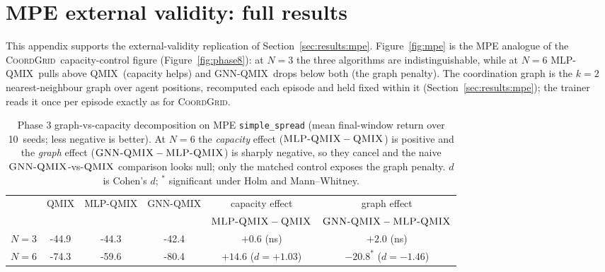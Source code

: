 \documentclass[manuscript, screen, review]{jair}
\newcommand{\algoname}[1]{\textsc{#1}}
\newcommand{\qmix}{\algoname{QMIX}}
\newcommand{\gnnqmix}{\algoname{GNN-QMIX}}
\newcommand{\coordgrid}{\textsc{CoordGrid}}
\newcommand{\mlpqmix}{\algoname{MLP-QMIX}}
\newcommand{\PEseeds}{10}             %
\newcommand{\PMqmixNthree}{-44.9}
\newcommand{\PMmlpNthree}{-44.3}
\newcommand{\PMgnnNthree}{-42.4}
\newcommand{\PMqmixNsix}{-74.3}
\newcommand{\PMmlpNsix}{-59.6}
\newcommand{\PMgnnNsix}{-80.4}
\newcommand{\PMgraphGapNthree}{+2.0}  %
\newcommand{\PMgraphGapNsix}{-20.8}   %
\newcommand{\PMcapGapNthree}{+0.6}    %
\newcommand{\PMcapGapNsix}{+14.6}     %
\newcommand{\PMgraphDNsix}{-1.46}     %
\newcommand{\PMcapDNsix}{+1.03}       %
\begin{document}
\section{MPE external validity: full results}
\label{app:mpe}

This appendix supports the external-validity replication of
Section~\ref{sec:results:mpe}. Figure~\ref{fig:mpe} is the MPE analogue of
the \coordgrid\ capacity-control figure (Figure~\ref{fig:phase8}): at
$N{=}3$ the three algorithms are indistinguishable, while at $N{=}6$
\mlpqmix\ pulls above \qmix\ (capacity helps) and \gnnqmix\ drops below
both (the graph penalty). The coordination graph is the $k{=}2$
nearest-neighbour graph over agent positions, recomputed each episode and
held fixed within it (Section~\ref{sec:results:mpe}); the trainer reads it
once per episode exactly as for \coordgrid.


\begin{table}[!ht]
  \centering
  \small
  \caption{Phase 3 graph-vs-capacity decomposition on MPE
  \texttt{simple\_spread} (mean final-window return over \PEseeds\ seeds;
  less negative is better). At $N{=}6$ the \emph{capacity} effect
  ($\mlpqmix-\qmix$) is positive and the \emph{graph} effect
  ($\gnnqmix-\mlpqmix$) is sharply negative, so they cancel and the naive
  $\gnnqmix$-vs-$\qmix$ comparison looks null; only the matched control
  exposes the graph penalty. $d$ is Cohen's $d$; ${}^\ast$ significant
  under Holm and Mann--Whitney.}
  \label{tab:mpe}
  \begin{tabular}{lccccc}
    \toprule
    & \qmix & \mlpqmix & \gnnqmix & capacity effect & graph effect \\
    & & & & {\footnotesize $\mlpqmix-\qmix$} & {\footnotesize $\gnnqmix-\mlpqmix$} \\
    \midrule
    $N=3$ & \PMqmixNthree & \PMmlpNthree & \PMgnnNthree
          & $\PMcapGapNthree$ (ns) & $\PMgraphGapNthree$ (ns) \\
    $N=6$ & \PMqmixNsix & \PMmlpNsix & \PMgnnNsix
          & $\PMcapGapNsix$ ($d{=}\PMcapDNsix$) & $\PMgraphGapNsix^\ast$ ($d{=}\PMgraphDNsix$) \\
    \bottomrule
  \end{tabular}
\end{table}
\end{document}
